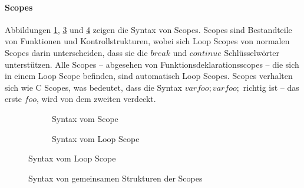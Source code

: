       \paragraph{Scopes}
        Abbildungen \ref{fig:scopesyntax}, \ref{fig:loopscopesyntax} und \ref{fig:commonsyntax} zeigen die Syntax von Scopes. Scopes sind Bestandteile von Funktionen und Kontrollstrukturen, wobei sich Loop Scopes von normalen Scopes darin unterscheiden, dass sie die \myMIn$break$ und \myMIn$continue$ Schlüsselwörter unterstützen. Alle Scopes -- abgesehen von Funktionsdeklarationsscopes -- die sich in einem Loop Scope befinden, sind automatisch Loop Scopes. Scopes verhalten sich wie C Scopes, was bedeutet, dass die Syntax \myMIn$var foo; {var foo;}$ richtig ist -- das erste \myMIn$foo$, wird von dem zweiten verdeckt.
        \begin{figure}[H]
          \centering
          \begin{minipage}{.45\linewidth}
            \vspace*{4.8em}
            \begin{figure}[H]
              \centering
              \caption{Syntax vom Scope}
              \label{fig:scopesyntax}
            \end{figure}
          \end{minipage}%
          \begin{minipage}{.45\linewidth}
            \begin{figure}[H]
              \centering
              \caption{Syntax vom Loop Scope}
              \label{fig:loopscopesyntax}
            \end{figure}
          \end{minipage}
        \end{figure}

        \begin{figure}[H]
          \centering
          \caption{Syntax von gemeinsamen Strukturen der Scopes}
          \label{fig:commonsyntax}
        \end{figure}

